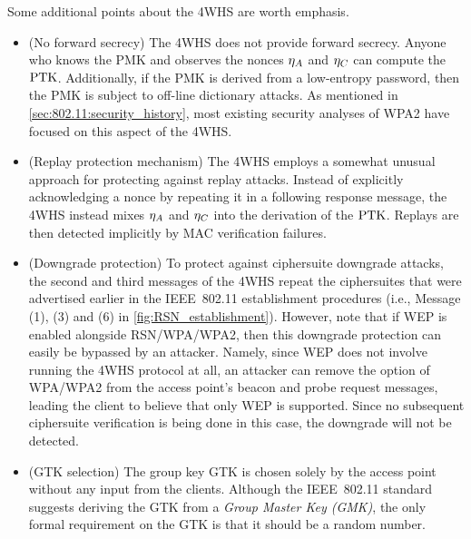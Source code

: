 \begin{remark}\label{remark:4WHS}
Some additional points about the 4WHS are worth emphasis.
\begin{itemize}
	\item (No forward secrecy) The 4WHS does not provide forward secrecy.
	 Anyone who knows the PMK and observes the nonces $\eta_{A}$ and $\eta_C$ can compute the $\mathrm{PTK}$.
	 Additionally, if the PMK is derived from a low-entropy password,  
	 then the PMK is subject to off-line dictionary attacks.
	 As mentioned in \cref{sec:802.11:security_history},
	 most  existing security analyses of WPA2 have focused on this aspect of the 4WHS.

	 
	\item (Replay protection mechanism) The 4WHS employs a somewhat unusual approach for protecting against replay attacks.
	Instead of explicitly acknowledging a nonce by repeating it in a following response message, 
	the 4WHS instead mixes $\eta_{A}$ and $\eta_C$ into the derivation of the $\mathrm{PTK}$.
	Replays are then detected implicitly by MAC verification failures. 
	
	\item (Downgrade protection) To protect against ciphersuite downgrade attacks,
	the second and third messages of the 4WHS  repeat the ciphersuites that were advertised earlier in the IEEE~802.11 establishment procedures
	(i.e., Message (1), (3) and (6) in \cref{fig:RSN_establishment}).
	However,
	note that if WEP is enabled alongside RSN/WPA/WPA2,
	then this downgrade protection can easily be bypassed by an attacker.
	Namely,
	since WEP does not involve running the 4WHS protocol at all,
	an attacker can remove the option of WPA/WPA2 from the access point's beacon and probe request messages,
	leading the client to believe that only WEP is supported.
	Since no subsequent ciphersuite verification is being  done in this case,
	the downgrade will not be detected.
	
	
	\item (GTK selection)
	The group key GTK is chosen solely by the access point without any input from the clients. 
	Although the IEEE~802.11 standard suggests deriving the GTK from a \emph{Group Master Key (GMK)},
	the only formal requirement on the GTK is that it should be a random number.
	
	

\end{itemize}
\end{remark}



